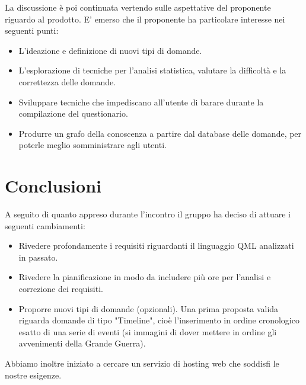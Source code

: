 \documentclass[a4paper,11pt]{article}
\begin{document}
		La discussione è poi continuata vertendo sulle aspettative del proponente riguardo al prodotto. E' emerso che il proponente ha particolare interesse nei seguenti punti:
		\begin{itemize}
			\item L'ideazione e definizione di nuovi tipi di domande.
			\item L'esplorazione di tecniche per l'analisi statistica, valutare la difficoltà e la correttezza delle domande.
			\item Sviluppare tecniche che impediscano all'utente di barare durante la compilazione del questionario.
			\item Produrre un grafo della conoscenza a partire dal database delle domande, per poterle meglio somministrare agli utenti.
		\end{itemize}
		\newpage
		
		\section{Conclusioni}
		A seguito di quanto appreso durante l'incontro il gruppo ha deciso di attuare i seguenti cambiamenti:
		\begin{itemize}
			\item Rivedere profondamente i requisiti riguardanti il linguaggio QML analizzati in passato.
			\item Rivedere la pianificazione in modo da includere più ore per l'analisi e correzione dei requisiti.
			\item Proporre nuovi tipi di domande (opzionali). Una prima proposta valida riguarda domande di tipo "Timeline", cioè l'inserimento in ordine cronologico esatto di una serie di eventi (si immagini di dover mettere in ordine gli avvenimenti della Grande Guerra).
		\end{itemize}
		Abbiamo inoltre iniziato a cercare un servizio di hosting web che soddisfi le nostre esigenze.
\end{document}
